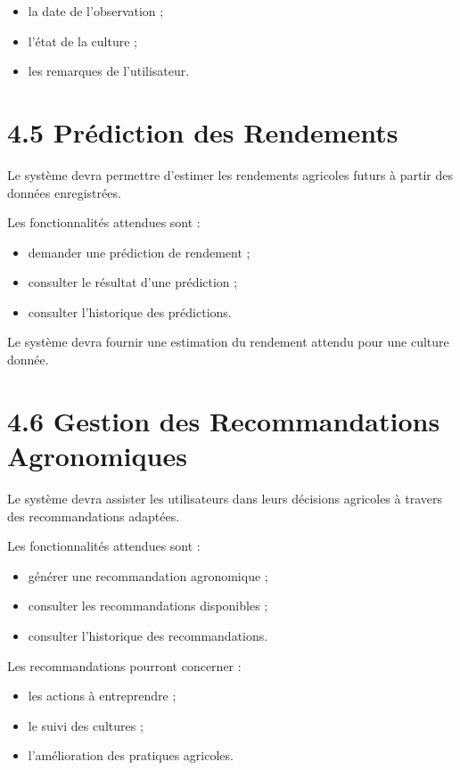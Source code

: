 \documentclass[12pt,a4paper]{report}
\begin{document}
\begin{itemize}
\item
  la date de l'observation ;
\item
  l'état de la culture ;
\item
  les remarques de l'utilisateur.
\end{itemize}

\section{4.5 Prédiction des
Rendements}\label{pruxe9diction-des-rendements-2}

Le système devra permettre d'estimer les rendements agricoles futurs à
partir des données enregistrées.

Les fonctionnalités attendues sont :

\begin{itemize}
\item
  demander une prédiction de rendement ;
\item
  consulter le résultat d'une prédiction ;
\item
  consulter l'historique des prédictions.
\end{itemize}

Le système devra fournir une estimation du rendement attendu pour une
culture donnée.

\section{4.6 Gestion des Recommandations
Agronomiques}\label{gestion-des-recommandations-agronomiques}

Le système devra assister les utilisateurs dans leurs décisions
agricoles à travers des recommandations adaptées.

Les fonctionnalités attendues sont :

\begin{itemize}
\item
  générer une recommandation agronomique ;
\item
  consulter les recommandations disponibles ;
\item
  consulter l'historique des recommandations.
\end{itemize}

Les recommandations pourront concerner :

\begin{itemize}
\item
  les actions à entreprendre ;
\item
  le suivi des cultures ;
\item
  l'amélioration des pratiques agricoles.
\end{itemize}
\end{document}
